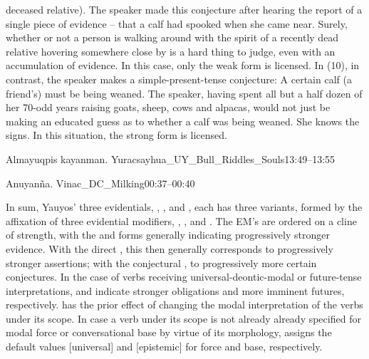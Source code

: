 deceased relative). The speaker made this conjecture after hearing the report of a single piece of evidence -- that a calf had spooked when she came near. Surely, whether or not a person is walking around with the spirit of a recently dead relative hovering somewhere close by is a hard thing to judge, even with an accumulation of evidence. In this case, only the weak \phono{-\uo{}} form is licensed. In (10), in contrast, the speaker makes a simple-present-tense  conjecture: A certain calf (a friend's) must be being weaned. The speaker, having spent all but a half dozen of her 70-odd years raising goats, sheep, cows and alpacas, would not just be making an educated guess as to whether a calf was being weaned. She knows the signs. In this situation, the strong  form is licensed. 

%
{Almayuqpis kayanman.}%
{}%
{Yuracsayhua\_UY\_Bull\_Riddles\_Souls}{13:49--13:55}%

%
{Anuyan\~na.}%
{}%
{Vinac\_DC\_Milking}{00:37--00:40}%

In sum, Yauyos' three evidentials, , , and , each has three variants, formed by the affixation of three evidential modifiers, \phono{-\uo}, , and . The EM's are ordered on a cline of strength, with the  and  forms generally indicating progressively stronger evidence. With the direct , this then generally corresponds to progressively stronger assertions; with the conjectural , to progressively more certain conjectures. In the case of verbs receiving universal-deontic-modal or future-tense interpretations,  and  indicate stronger obligations and more imminent futures, respectively.  has the prior effect of changing the modal interpretation of the verbs under its scope. In case a verb under its scope is not already already specified for modal force or conversational base by virtue of its morphology,  assigns the default values [universal] and [epistemic] for force and base, respectively.

